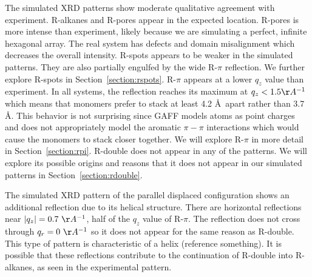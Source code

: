 \documentclass[journal=jpcbfk,manusciprt=article]{achemso}
\begin{document}
  The simulated XRD patterns show moderate qualitative agreement with experiment. R-alkanes and
  R-pores appear in the expected location. R-pores is more intense than experiment, likely
  because we are simulating a perfect, infinite hexagonal array. The real system has defects and
  domain misalignment which decreases the overall intensity.
  R-spots appears to be weaker in the simulated patterns. They are also partially engulfed by
  the wide R-$\pi$ reflection. We further explore R-spots in Section~\ref{section:rspots}.  
  R-$\pi$ appears at a lower $q_z$ value than experiment. In all systems, the reflection 
  reaches its maximum at $q_z < 1.5 \AA^{-1}$ which means that monomers prefer to stack 
  at least 4.2 \AA~apart rather than 3.7 \AA. This behavior is not surprising since GAFF models
  atoms as point charges and does not appropriately model the aromatic $\pi-\pi$ interactions 
  which would cause the monomers to stack closer together. We will explore R-$\pi$ in more detail
  in Section~\ref{section:rpi}. R-double does not appear in any of the patterns. We will explore
  its possible origins and reasons that it does not appear in our simulated patterns in
  Section~\ref{section:rdouble}.
  
  The simulated XRD pattern of the parallel displaced configuration shows an additional
  reflection due to its helical structure. There are horizontal reflections near $|q_z|= 
  0.7~\AA^{-1}$, half of the $q_z$ value of R-$\pi$. The reflection does not cross through
  $q_r = 0~\AA^{-1}$ so it does not appear for the same reason as R-double. This type of pattern
  is characteristic of a helix (reference something).
  It is possible that these reflections contribute to the continuation of R-double into R-
  alkanes, as seen in the experimental pattern.
\end{document}
